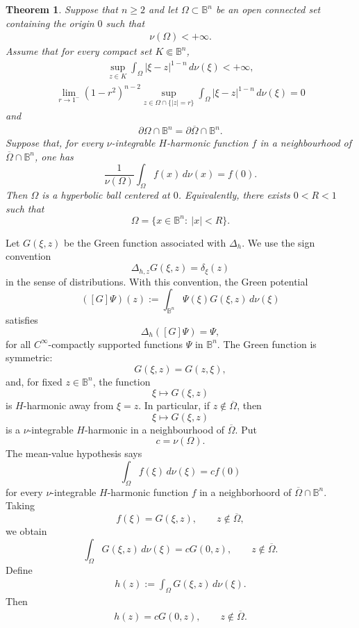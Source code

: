 \documentclass[10pt,a4paper]{amsart}
\newtheorem{theorem}{Theorem}
\newcommand{\Bn}{\mathbb B^n}
\newcommand{\Dh}{\Delta_h}
\begin{document}
\begin{theorem}\label{main}
Suppose that \(n\ge2\) and let \(\Omega\subset \Bn\) be an open connected set  containing the origin $0$ such that
\begin{eqnarray}\label{finiteVol}
\nu(\Omega)<+\infty.
\end{eqnarray}
Assume that for every compact set \(K\Subset\mathbb B^n\),
\begin{eqnarray}\label{C1cond}
\sup_{z\in K}
\int_\Omega |\xi-z|^{1-n}\,d\nu(\xi)
<+\infty,
\end{eqnarray}
\begin{eqnarray}\label{C1bcond}
\lim_{r\to1^-} (1-r^2)^{n-2}
\sup_{z\in\Omega\cap\{|z|=r\}}
\int_\Omega |\xi-z|^{1-n}\,d\nu(\xi)=0
\end{eqnarray}
and
\begin{eqnarray}\label{Topcond}
\partial\Omega\cap\mathbb B^n =\partial\overline{\Omega}\cap\mathbb B^n.
\end{eqnarray}
Suppose that, for every $\nu$-integrable  \(H\)-harmonic function \(f\) in a neighbourhood of
\(\overline{\Omega} \cap\mathbb B^n\), one has
\[
\frac1{\nu(\Omega)}\int_\Omega f(x)\,d\nu(x)=f(0).
\]
Then \(\Omega\) is a hyperbolic ball centered at \(0\). Equivalently, there
exists \(0<R<1\) such that
\[
\Omega=\{x\in\Bn:\ |x|<R\}.
\]
\end{theorem}

Let \(G(\xi,z)\) be the Green function associated with \(\Dh\). We use the
sign convention
\[
\Delta_{h,z} G(\xi,z)=\delta_\xi(z)
\]
in the sense of distributions. With this convention, the Green potential
\[
([G]\Psi)(z):=\int_{\Bn}\Psi(\xi)G(\xi,z)\,d\nu(\xi)
\]
satisfies
\[
\Dh ([ G]\Psi)=\Psi,
\]
for all $C^\infty$-compactly supported functions $\Psi$ in $\Bn.$
The Green function is symmetric:
\[
G(\xi,z)=G(z,\xi),
\]
and, for fixed \(z \in \mathbb B^n\), the function
\[
\xi\longmapsto G(\xi,z)
\]
is \(H\)-harmonic away from \(\xi=z\).
In particular, if \(z\notin\overline{\Omega}\), then
\[
\xi\longmapsto G(\xi,z)
\]
is a $\nu$-integrable \(H\)-harmonic in a neighbourhood of \(\overline{\Omega}\).
Put
\[
c=\nu(\Omega).
\]
The mean-value hypothesis says
\[
\int_\Omega f(\xi)\,d\nu(\xi)=c f(0)
\]
for every $\nu$-integrable \(H\)-harmonic function \(f\) in a neighborhoord of  \(\overline{\Omega}\cap\mathbb B^n\).
Taking
\[
f(\xi)=G(\xi,z),
\qquad z\notin\overline{\Omega},
\]
we obtain
\[
\int_\Omega G(\xi,z)\,d\nu(\xi)=cG(0,z),
\qquad z\notin\overline{\Omega}.
\]
Define
\begin{eqnarray}\label{h}
h(z):=\int_\Omega G(\xi,z)\,d\nu(\xi).
\end{eqnarray}
Then
\begin{eqnarray}\label{hG}
h(z)=cG(0,z),
\qquad z\notin\overline{\Omega}.
\end{eqnarray}
\end{document}

